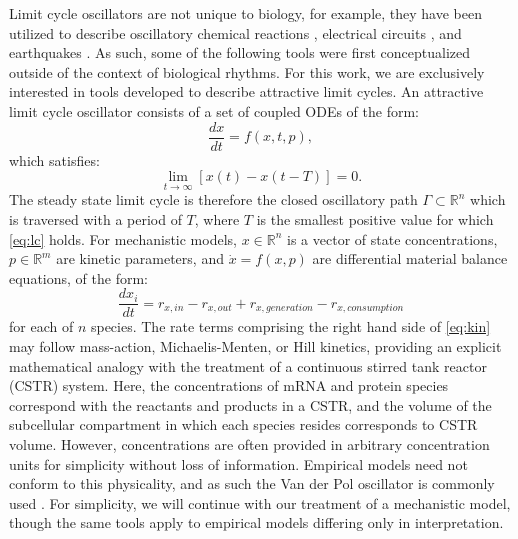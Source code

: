 Limit cycle oscillators are not unique to biology, for example, they have been utilized to describe oscillatory chemical reactions \cite{Field1974}, electrical circuits \cite{VanderPol1926}, and earthquakes \cite{Huang1990}.
As such, some of the following tools were first conceptualized outside of the context of biological rhythms.
For this work, we are exclusively interested in tools developed to describe attractive limit cycles.
An attractive limit cycle oscillator consists of a set of coupled ODEs of the form:
\begin{equation}
    \label{eq:odes}
    \frac{dx}{dt} = f(x, t, p),
\end{equation}
which satisfies:
\begin{equation}
    \label{eq:lc}
    \lim_{t\to\infty}[x(t) - x(t-T)]=0.
\end{equation}
The steady state limit cycle is therefore the closed oscillatory path $\Gamma\subset\mathbb{R}^n$ which is traversed with a period of $T$, where $T$ is the smallest positive value for which \eqref{eq:lc} holds.
For mechanistic models, $x \in \mathbb{R}^n$ is a vector of state concentrations, $p \in \mathbb{R}^m$ are kinetic parameters, and $\dot x = f(x,p)$ are differential material balance equations, of the form:
\begin{equation}
    \label{eq:kin}
    \frac{dx_i}{dt} = r_{x,in}-r_{x,out} +r_{x,generation}-r_{x,consumption}
\end{equation}
for each of $n$ species. 
The rate terms comprising the right hand side of \eqref{eq:kin} may follow mass-action, Michaelis-Menten, or Hill kinetics, providing an explicit mathematical analogy with the treatment of a continuous stirred tank reactor (CSTR) system.
Here, the concentrations of mRNA and protein species correspond with the reactants and products in a CSTR, and the volume of the subcellular compartment in which each species resides corresponds to CSTR volume.
However, concentrations are often provided in arbitrary concentration units for simplicity without loss of information.
Empirical models need not conform to this physicality, and as such the Van der Pol oscillator is commonly used \cite{Kronauer1999}.
For simplicity, we will continue with our treatment of a mechanistic model, though the same tools apply to empirical models differing only in interpretation.



